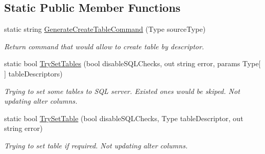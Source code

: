 \subsection*{Static Public Member Functions}
\begin{DoxyCompactItemize}
\item 
static string \mbox{\hyperlink{class_uniform_data_operator_1_1_sql_1_1_tables_1_1_attributes_1_1_table_aab5f211f9d9f392317fbe610ba63d91c}{Generate\+Create\+Table\+Command}} (Type source\+Type)
\begin{DoxyCompactList}\small\item\em Return command that would allow to create table by descriptor. \end{DoxyCompactList}\item 
static bool \mbox{\hyperlink{class_uniform_data_operator_1_1_sql_1_1_tables_1_1_attributes_1_1_table_ac3f20322c0c96c7cbd876d4a8bc29656}{Try\+Set\+Tables}} (bool disable\+S\+Q\+L\+Checks, out string error, params Type\mbox{[}$\,$\mbox{]} table\+Descriptors)
\begin{DoxyCompactList}\small\item\em Trying to set some tables to S\+QL server. Existed ones would be skiped. Not updating alter columns. \end{DoxyCompactList}\item 
static bool \mbox{\hyperlink{class_uniform_data_operator_1_1_sql_1_1_tables_1_1_attributes_1_1_table_a609ed9b13e7e9007709d76a6f08d96e8}{Try\+Set\+Table}} (bool disable\+S\+Q\+L\+Checks, Type table\+Descriptor, out string error)
\begin{DoxyCompactList}\small\item\em Trying to set table if required. Not updating alter columns. \end{DoxyCompactList}\end{DoxyCompactItemize}
